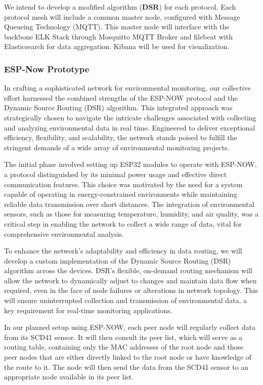 We intend to develop a modified algorithm (\textbf{DSR}) for each protocol. Each protocol mesh will include a common master node, configured with Message Queueing Technology (MQTT). This master node will interface with the backbone ELK Stack through Mosquitto MQTT Broker and filebeat with Elasticsearch for data aggregation. Kibana will be used for visualization.

\subsubsection{ESP-Now Prototype}

In crafting a sophisticated network for environmental monitoring, our collective effort harnessed the combined strengths of the ESP-NOW protocol and the Dynamic Source Routing (DSR) algorithm. This integrated approach was strategically chosen to navigate the intricate challenges associated with collecting and analyzing environmental data in real time. Engineered to deliver exceptional efficiency, flexibility, and scalability, the network stands poised to fulfill the stringent demands of a wide array of environmental monitoring projects.

The initial phase involved setting up ESP32 modules to operate with ESP-NOW, a protocol distinguished by its minimal power usage and effective direct communication features. This choice was motivated by the need for a system capable of operating in energy-constrained environments while maintaining reliable data transmission over short distances. The integration of environmental sensors, such as those for measuring temperature, humidity, and air quality, was a critical step in enabling the network to collect a wide range of data, vital for comprehensive environmental analysis.

To enhance the network's adaptability and efficiency in data routing, we will develop a custom implementation of the Dynamic Source Routing (DSR) algorithm across the devices. DSR's flexible, on-demand routing mechanism will allow the network to dynamically adjust to changes and maintain data flow when required, even in the face of node failures or alterations in network topology. This will ensure uninterrupted collection and transmission of environmental data, a key requirement for real-time monitoring applications.

In our planned setup using ESP-NOW, each peer node will regularly collect data from its SCD41 sensor. It will then consult its peer list, which will serve as a routing table, containing only the MAC addresses of the root node and those peer nodes that are either directly linked to the root node or have knowledge of the route to it. The node will then send the data from the SCD41 sensor to an appropriate node available in its peer list.

